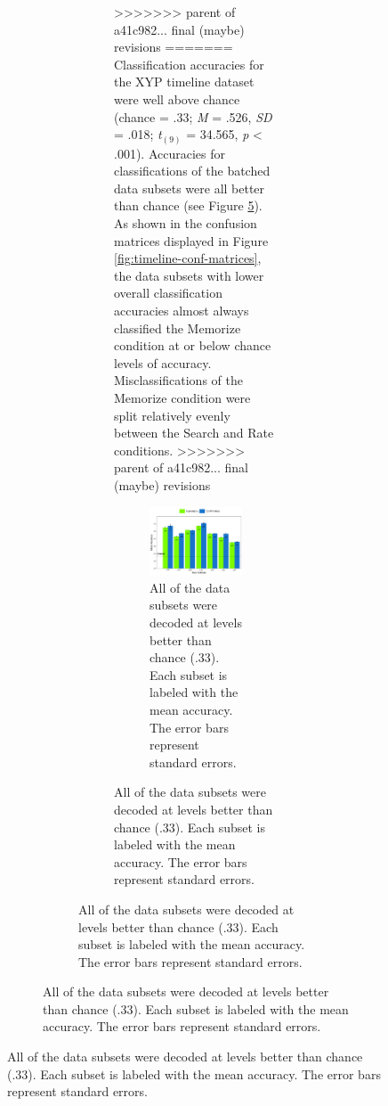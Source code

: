 \documentclass[
  english,
  man, donotrepeattitle,floatsintext]{apa6}
\begin{document}
\begin{figure}
\begin{figure}
\begin{figure}
\begin{figure}
>>>>>>> parent of a41c982... final (maybe) revisions
=======
Classification accuracies for the XYP timeline dataset were well above chance (chance = .33; \emph{M} = .526, \emph{SD} = .018; \emph{t}\(_{(9)}\) = 34.565, \emph{p} \textless{} .001). Accuracies for classifications of the batched data subsets were all better than chance (see Figure \ref{fig:timeline-parcellation-chance}). As shown in the confusion matrices displayed in Figure \ref{fig:timeline-conf-matrices}, the data subsets with lower overall classification accuracies almost always classified the Memorize condition at or below chance levels of accuracy. Misclassifications of the Memorize condition were split relatively evenly between the Search and Rate conditions.
>>>>>>> parent of a41c982... final (maybe) revisions

\begin{figure}
\centering
\includegraphics{figures/r_code/timeline_subset_chance.pdf}
\caption{\label{fig:timeline-parcellation-chance}All of the data subsets were decoded at levels better than chance (.33). Each subset is labeled with the mean accuracy. The error bars represent standard errors.}
\end{figure}


\end{figure}
\end{figure}
\end{figure}
\end{figure}
\end{document}
